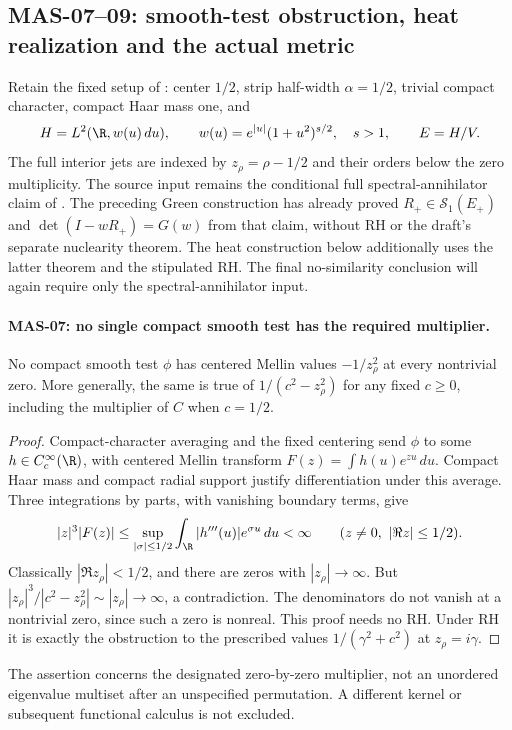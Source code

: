 \subsection{MAS-07--09: smooth-test obstruction, heat realization and the actual metric}
Retain the fixed setup of : center $1/2$, strip half-width $\alpha=1/2$, trivial compact character, compact Haar mass one, and
\[
 H=L^2(\R,w(u)\,du),\qquad
 w(u)=e^{|u|}(1+u^2)^{s/2},\quad s>1,\qquad E=H/V.
\]
The full interior jets are indexed by $z_\rho=\rho-1/2$ and their orders below the zero multiplicity. The source input remains the conditional full spectral-annihilator claim of \cite[Theorem 10.2.2.1, (10.2.2.4)--(10.2.2.6), p.~446]{masullo}. The preceding Green construction has already proved $R_+\in\mathcal S_1(E_+)$ and $\det(I-wR_+)=G(w)$ from that claim, without RH or the draft's separate nuclearity theorem. The heat construction below additionally uses the latter theorem and the stipulated RH. The final no-similarity conclusion will again require only the spectral-annihilator input.

\paragraph{MAS-07: no single compact smooth test has the required multiplier.}
No compact smooth test $\phi$ has centered Mellin values $-1/z_\rho^2$ at every nontrivial zero. More generally, the same is true of $1/(c^2-z_\rho^2)$ for any fixed $c\ge0$, including the multiplier of $C$ when $c=1/2$.
\begin{proof}
Compact-character averaging and the fixed centering send $\phi$ to some $h\in C_c^\infty(\R)$, with centered Mellin transform
$F(z)=\int h(u)e^{zu}\,du$. Compact Haar mass and compact radial support justify differentiation under this average. Three integrations by parts, with vanishing boundary terms, give
\[
 |z|^3|F(z)|\le
 \sup_{|\sigma|\le1/2}\int_\R |h'''(u)|e^{\sigma u}\,du<\infty
 \qquad(z\ne0,\ |\Re z|\le1/2).
\]
Classically $|\Re z_\rho|<1/2$, and there are zeros with $|z_\rho|\to\infty$. But
$|z_\rho|^3/|c^2-z_\rho^2|\sim|z_\rho|\to\infty$, a contradiction. The denominators do not vanish at a nontrivial zero, since such a zero is nonreal. This proof needs no RH. Under RH it is exactly the obstruction to the prescribed values $1/(\gamma^2+c^2)$ at $z_\rho=i\gamma$.
\end{proof}
The assertion concerns the designated zero-by-zero multiplier, not an unordered eigenvalue multiset after an unspecified permutation. A different kernel or subsequent functional calculus is not excluded.

